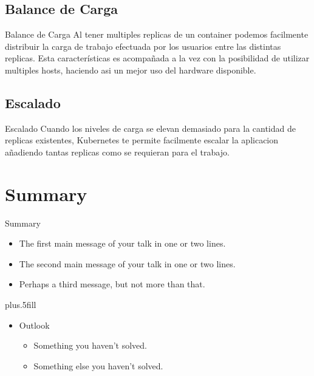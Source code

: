 \documentclass{beamer}
\begin{document}
\subsection{Balance de Carga}

\begin{frame}{Balance de Carga}
	Al tener multiples replicas de un container podemos facilmente distribuir la carga de trabajo efectuada por los usuarios entre las distintas replicas.
	Esta características es acompañada a la vez con la posibilidad de utilizar multiples hosts, haciendo asi un mejor uso del hardware disponible.
\end{frame}


\subsection{Escalado}

\begin{frame}{Escalado}
	Cuando los niveles de carga se elevan demasiado para la cantidad de replicas existentes, Kubernetes te permite facilmente escalar la aplicacion
	añadiendo tantas replicas como se requieran para el trabajo.
\end{frame}

\section*{Summary}

\begin{frame}{Summary}

  \begin{itemize}
  \item
    The \alert{first main message} of your talk in one or two lines.
  \item
    The \alert{second main message} of your talk in one or two lines.
  \item
    Perhaps a \alert{third message}, but not more than that.
  \end{itemize}
  
  \vskip0pt plus.5fill
  \begin{itemize}
  \item
    Outlook
    \begin{itemize}
    \item
      Something you haven't solved.
    \item
      Something else you haven't solved.
    \end{itemize}
  \end{itemize}
\end{frame}
\end{document}
